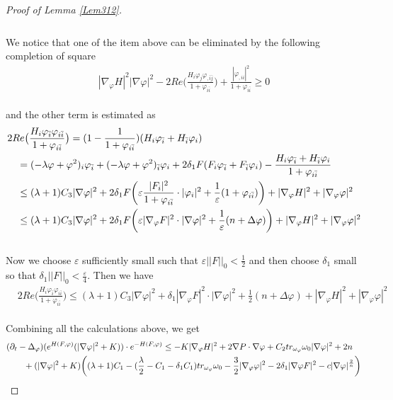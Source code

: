 \documentclass[11pt]{amsart}
\numberwithin{equation}{section}
\newcommand \eps{\varepsilon}
\begin{document}
\begin{proof}[Proof of Lemma \ref{Lem312}]
\begin{align}
\end{align}\\
We notice that one of the item above can be eliminated by the following completion of square 
\begin{align}
	|\nabla_{\varphi}H|^2|\nabla\varphi|^2-2Re\big(\frac{H_i\varphi_j\varphi_{,\bar{i}\bar{j}}}{1+\varphi_{i\bar{i}}}\big)+\frac{|\varphi_{,ii}|^2}{1+\varphi_{i\bar{i}}}\ge  0
\end{align}\\
and the other term is estimated as 
\begin{align}
	& 2Re\big(\frac{H_i\varphi_{\bar{i}}\varphi_{i\bar{i}}}{1+\varphi_{i\bar{i}}}\big) = (1-\frac{1}{1+\varphi_{i\bar i}})(H_i\varphi_{\bar i}+H_{\bar i}\varphi_i) \notag\\
	&\quad = (-\lambda\varphi+\varphi^2)_i\varphi_{\bar i}+(-\lambda\varphi+\varphi^2)_{\bar i}\varphi_i + 2\delta_1F(F_i\varphi_{\bar i}+F_{\bar i}\varphi_i)-\frac{H_i\varphi_{\bar i}+H_{\bar i}\varphi_i}{1+\varphi_{i\bar i}} \notag\\
	&\quad \le  (\lambda+1)C_3|\nabla\varphi|^2 + 2\delta_1F \bigg( \eps \frac{|F_i|^2}{1+\varphi_{i\bar i}}\cdot |\varphi_i|^2 + \frac{1}{\eps}(1+\varphi_{i\bar i})\bigg)+|\nabla_\varphi H|^2+|\nabla_\varphi\varphi|^2 \notag\\
	&\quad \le  (\lambda+1)C_3|\nabla\varphi|^2 + 2\delta_1F\bigg(\eps |\nabla_\varphi F|^2\cdot |\nabla\varphi|^2+\frac{1}{\eps}(n+\Delta\varphi )\bigg)+|\nabla_\varphi H|^2+|\nabla_\varphi\varphi|^2
\end{align}\\
Now we choose $\eps$ sufficiently small such that $\eps ||F||_0<\frac{1}{2}$ and then choose $\delta_1$ small so that $\delta_1||F||_0<\frac{\eps}{4}$. Then we have 
\begin{align}
	& 2Re\big(\frac{H_i\varphi_{\bar{i}}\varphi_{i\bar{i}}}{1+\varphi_{i\bar{i}}}\big) \le  (\lambda+1)C_3|\nabla\varphi|^2 + \delta_1 |\nabla_\varphi F|^2\cdot |\nabla\varphi|^2+\frac{1}{2}(n+\Delta\varphi ) +|\nabla_\varphi H|^2+|\nabla_\varphi\varphi|^2
\end{align}\\
Combining all the calculations above, we get 
\begin{align}
	&(\partial_t-\Delta_{\varphi})(e^{H(F,\varphi)}(|\nabla\varphi|^2+K))\cdot e^{-H(F,\varphi)} \le  -K |\nabla_\varphi H|^2+ 2\nabla P\cdot\nabla\varphi + C_2 tr_{\omega_{\varphi}}\omega_0 |\nabla\varphi|^2 +2n \notag \\
	&\qquad +(|\nabla\varphi|^2+K)\bigg( (\lambda+1)C_1 -(\frac{\lambda}{2} - C_1-\delta_1C_1)tr_{\omega_{\varphi}}\omega_0 - \frac{3}{2} |\nabla_\varphi\varphi|^2-2\delta_1|\nabla\varphi F|^2 - c|\nabla\varphi|^{\frac{2}{n}}\bigg) \notag\\

\end{align}
\end{proof}
\end{document}
